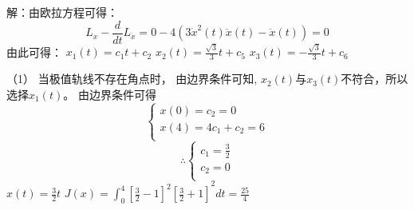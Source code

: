 \documentclass[UTF8]{ctexart}
\begin{document}
解：由欧拉方程可得：
		\[{{L}_{x}}-\frac{d}{dt}{{L}_{{\dot{x}}}}=0-4\left( 3{{{\dot{x}}}^{2}}\left( t \right)\ddot{x}\left( t \right)-\ddot{x}\left( t \right) \right)=0\]
		由此可得：
${{x}_{1}}\left( t \right)={{c}_{1}}t+{{c}_{2}}$
${{x}_{2}}\left( t \right)=\frac{\sqrt{3}}{3}t+{{c}_{5}}$
${{x}_{3}}\left( t \right)=-\frac{\sqrt{3}}{3}t+{{c}_{6}}$

（1）	当极值轨线不存在角点时，
由边界条件可知, ${{x}_{2}}\left( t \right)$与${{x}_{3}}\left( t \right)$不符合，所以选择${{x}_{1}}\left( t \right)$。
由边界条件可得
\[\left\{ \begin{array}{*{35}{l}}
   x\left( 0 \right)={{c}_{2}}=0  \\
   x\left( 4 \right)=4{{c}_{1}}+{{c}_{2}}=6  \\
\end{array} \right.\]
\[\therefore \left\{ \begin{array}{*{35}{l}}
   {{c}_{1}}=\frac{3}{2}  \\
   {{c}_{2}}=0  \\
\end{array} \right.\]
$x\left( t \right)=\frac{3}{2}t$
$J(x)={{\int_{0}^{4}{{{\left[ \frac{3}{2}-1 \right]}^{2}}\left[ \frac{3}{2}+1 \right]}}^{2}}dt=\frac{25}{4}$
\end{document}
